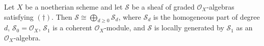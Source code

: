 Let $X$ be a noetherian scheme and let $\mathcal{S}$ be a sheaf of graded $\mathcal{O}_X$-algebras satisfying $(\dagger)$. Then $\mathcal{S} \cong \bigoplus_{d \geqslant 0} \mathcal{S}_d$, where $\mathcal{S}_d$ is the homogeneous part of degree $d$, $\mathcal{S}_0 = \mathcal{O}_X$, $\mathcal{S}_1$ is a coherent $\mathcal{O}_X$-module, and $\mathcal{S}$ is locally generated by $\mathcal{S}_1$ as an $\mathcal{O}_X$-algebra.
